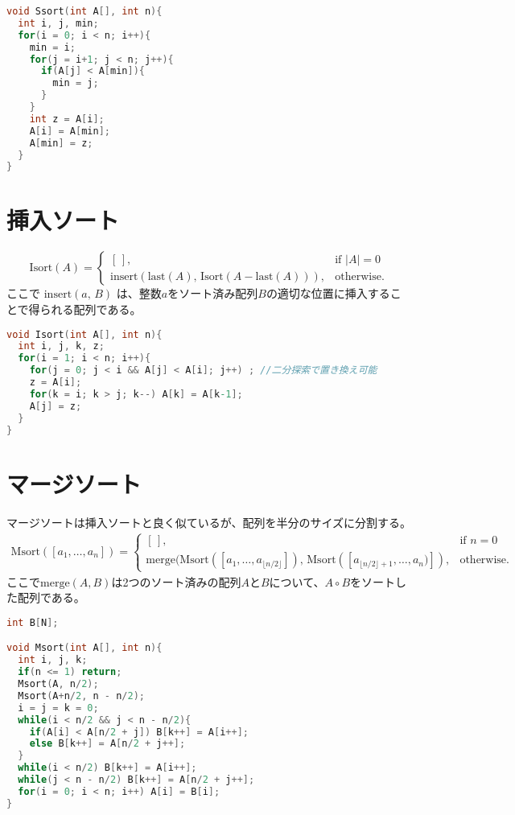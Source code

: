 \documentclass[a4paper,twoside,onecolumn,openany,article,10pt]{memoir}
\theoremstyle{remark}
\begin{document}
\begin{lstlisting}[basicstyle=\ttfamily\normalsize,showstringspaces=false,language=C,frame=single]
void Ssort(int A[], int n){
  int i, j, min;
  for(i = 0; i < n; i++){
    min = i;
    for(j = i+1; j < n; j++){
      if(A[j] < A[min]){
        min = j;
      }
    }
    int z = A[i];
    A[i] = A[min];
    A[min] = z;
  }
}
\end{lstlisting}

\section{挿入ソート}
\begin{equation*}
\mathrm{Isort}(A) =
\begin{cases}
[\,],&\text{if } |A| = 0\\
\mathrm{insert}(\mathrm{last}(A),\, \mathrm{Isort}(A - \mathrm{last}(A))),& \text{otherwise.}
\end{cases}
\end{equation*}
ここで
$\mathrm{insert}(a,\, B)$
は、整数$a$をソート済み配列$B$の適切な位置に挿入することで得られる配列である。

\begin{lstlisting}[basicstyle=\ttfamily\normalsize,showstringspaces=false,language=C,frame=single]
void Isort(int A[], int n){
  int i, j, k, z;
  for(i = 1; i < n; i++){
    for(j = 0; j < i && A[j] < A[i]; j++) ; //二分探索で置き換え可能
    z = A[i];
    for(k = i; k > j; k--) A[k] = A[k-1];
    A[j] = z;
  }
}
\end{lstlisting}


\section{マージソート}
マージソートは挿入ソートと良く似ているが、配列を半分のサイズに分割する。
\begin{align*}
\mathrm{Msort}([a_1,\dotsc,a_n]) =
\begin{cases}
[\,],& \text{if } n = 0\\
\mathrm{merge}(\mathrm{Msort}([a_1,\dotsc,a_{\lfloor n/2\rfloor}]),\, \mathrm{Msort}([a_{\lfloor n/2\rfloor+1}, \dotsc,a_n)]),& \text{otherwise.}
\end{cases}
\end{align*}
ここで$\mathrm{merge}(A, B)$は2つのソート済みの配列$A$と$B$について、$A\circ B$をソートした配列である。
\begin{lstlisting}[basicstyle=\ttfamily\normalsize,showstringspaces=false,language=C,frame=single]
int B[N];

void Msort(int A[], int n){
  int i, j, k;
  if(n <= 1) return;
  Msort(A, n/2);
  Msort(A+n/2, n - n/2);
  i = j = k = 0;
  while(i < n/2 && j < n - n/2){
    if(A[i] < A[n/2 + j]) B[k++] = A[i++];
    else B[k++] = A[n/2 + j++];
  }
  while(i < n/2) B[k++] = A[i++];
  while(j < n - n/2) B[k++] = A[n/2 + j++];
  for(i = 0; i < n; i++) A[i] = B[i];
}
\end{lstlisting}
\end{document}
